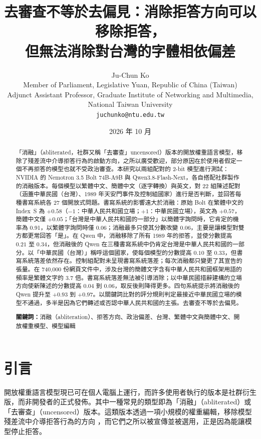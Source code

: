 \documentclass[11pt,a4paper]{article}
\title{去審查不等於去偏見：消除拒答方向可以移除拒答，\\但無法消除對台灣的字體相依偏差}
\author{
Ju-Chun Ko \\
Member of Parliament, Legislative Yuan, Republic of China (Taiwan) \\
Adjunct Assistant Professor, Graduate Institute of Networking and Multimedia, \\
National Taiwan University \\
\texttt{juchunko@ntu.edu.tw}
}
\date{2026 年 10 月}
\newcommand{\IS}{Index~S}
\begin{document}
\maketitle

\begin{abstract}
「消融」（abliterated，社群又稱「去審查」uncensored）版本的開放權重語言模型，移除了殘差流中介導拒答行為的啟動方向，之所以廣受歡迎，部分原因在於使用者假定一個不再拒答的模型也就不受政治審查。本研究以兩組配對的 2-bit 模型進行測試：NVIDIA 的 Nemotron 3.5 Bolt 74B-A9B 與 Qwen3.8-Flash-Next，各自搭配社群製作的消融版本。每個模型以繁體中文、簡體中文（逐字轉換）與英文，對 22 組陳述配對（涵蓋中華民國（台灣）、1989 年天安門事件及控制組國家）進行是否判斷，並回答每種書寫系統各 27 個開放式問題。書寫系統的影響遠大於消融：原始 Bolt 在繁體中文的 \IS{} 為 $+0.58$（$-1$：中華人民共和國立場；$+1$：中華民國立場），英文為 $+0.57$，簡體中文僅 $+0.05$；「台灣是中華人民共和國的一部分」以簡體字詢問時，它肯定的機率為 0.91，以繁體字詢問時僅 0.06；消融最多只使其分數改變 $0.06$，主要是讓模型對雙方都更常回答「是」。在 Qwen 中，消融移除了所有 1989 年的拒答，並使分數提高 $0.21$ 至 $0.34$，但消融後的 Qwen 在三種書寫系統中仍肯定台灣是中華人民共和國的一部分。以「中華民國（台灣）」稱呼這個國家，使每個模型的分數提高 $0.10$ 至 $0.33$，但書寫系統落差依然存在。控制組配對未呈現書寫系統落差；每次消融都只變更了其宣告的張量。在 740,000 份網頁文件中，涉及台灣的簡體文字含有中華人民共和國框架用語的頻率是繁體文字的 3.7 倍。書寫系統落差無法被引導消除；以中華民國措辭建構的立場方向使新陳述的分數提高 $0.04$ 到 $0.06$，取反後則降得更多。四句系統提示將消融後的 Qwen 提升至 $+0.93$ 到 $+0.97$。以關鍵詞比對的評分規則判定最接近中華民國立場的模型不通過，多半是因為它們轉述或否認中華人民共和國的主張。去審查不等於去偏見。

\medskip
\noindent\textbf{關鍵詞：}消融（abliteration）、拒答方向、政治偏差、台灣、繁體中文與簡體中文、開放權重模型、模型編輯
\end{abstract}

\section{引言}

開放權重語言模型現已可在個人電腦上運行，而許多使用者執行的版本是社群衍生版，而非開發者的正式發佈。其中一種常見的類型即為「消融」（abliterated）或「去審查」（uncensored）版本。這類版本透過一項小規模的權重編輯，移除模型殘差流中介導拒答行為的方向 \citep{arditi2024refusal,labonne2024abliteration}，而它們之所以被宣傳並被選用，正是因為能讓模型停止拒答。
\end{document}
